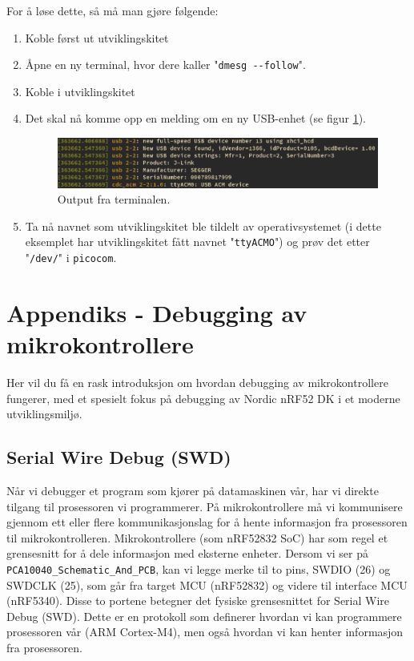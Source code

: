 For å løse dette, så må man gjøre følgende:
\begin{enumerate}
    \item Koble først ut utviklingskitet
    \item Åpne en ny terminal, hvor dere kaller "\verb|dmesg --follow|".
    \item Koble i utviklingskitet
    \item Det skal nå komme opp en melding om en ny USB-enhet (se figur \ref{fig:picocom-terminal-output}).
    \begin{figure}[ht]
        \centering
       \includegraphics[scale=0.4]{figures/picocom.JPG}
        \caption{Output fra terminalen.}
        \label{fig:picocom-terminal-output}
    \end{figure}
    
    \item Ta nå navnet som utviklingskitet ble tildelt av operativsystemet (i dette eksemplet har utviklingskitet fått navnet "\verb|ttyACMO|") og prøv det etter "\verb|/dev/|" i \verb|picocom|.
    
\end{enumerate}

\section{Appendiks - Debugging av mikrokontrollere}
\label{app:Debugging}

Her vil du få en rask introduksjon om hvordan debugging av mikrokontrollere fungerer, med et spesielt fokus på debugging av Nordic nRF52 DK i et moderne utviklingsmiljø.

\subsection{Serial Wire Debug (SWD)}

Når vi debugger et program som kjører på datamaskinen vår, har vi direkte tilgang til prosessoren vi programmerer. På mikrokontrollere må vi kommunisere gjennom ett eller flere kommunikasjonslag for å hente informasjon fra prosessoren til mikrokontrolleren. Mikrokontrollere (som nRF52832 SoC) har som regel et grensesnitt for å dele informasjon med eksterne enheter. Dersom vi ser på \verb|PCA10040_Schematic_And_PCB|, kan vi legge merke til to pins, SWDIO (26) og SWDCLK (25), som går fra target MCU (nRF52832) og videre til interface MCU (nRF5340). Disse to portene betegner det fysiske grensesnittet for Serial Wire Debug (SWD). Dette er en protokoll som definerer hvordan vi kan programmere prosessoren vår (ARM Cortex-M4), men også hvordan vi kan henter informasjon fra prosessoren. 

